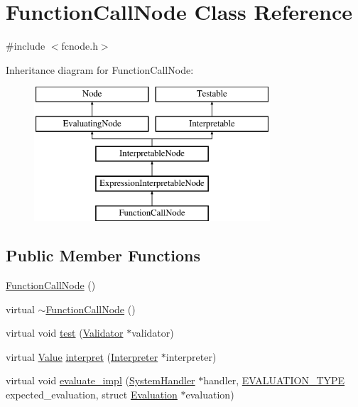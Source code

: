\hypertarget{classFunctionCallNode}{}\section{Function\+Call\+Node Class Reference}
\label{classFunctionCallNode}


{\ttfamily \#include $<$fcnode.\+h$>$}

Inheritance diagram for Function\+Call\+Node\+:\begin{figure}[H]
\begin{center}
\leavevmode
\includegraphics[height=5.000000cm]{classFunctionCallNode}
\end{center}
\end{figure}
\subsection*{Public Member Functions}
\begin{DoxyCompactItemize}
\item 
\hyperlink{classFunctionCallNode_af4c639d83ec4fc10ee4648277cedc134}{Function\+Call\+Node} ()
\item 
virtual \hyperlink{classFunctionCallNode_a781834ac40eada17d2f9dc53a8bd26e5}{$\sim$\+Function\+Call\+Node} ()
\item 
virtual void \hyperlink{classFunctionCallNode_a5a7f576984942e2e39057d716d8a5547}{test} (\hyperlink{classValidator}{Validator} $\ast$validator)
\item 
virtual \hyperlink{classValue}{Value} \hyperlink{classFunctionCallNode_a1d0d8806b7dd501ed43da58f77f7c49e}{interpret} (\hyperlink{classInterpreter}{Interpreter} $\ast$interpreter)
\item 
virtual void \hyperlink{classFunctionCallNode_a65f15b75804343caf5c4ce291460b1dc}{evaluate\+\_\+impl} (\hyperlink{classSystemHandler}{System\+Handler} $\ast$handler, \hyperlink{statics_8h_a6664c451ca7787483a7981cc1de68dbb}{E\+V\+A\+L\+U\+A\+T\+I\+O\+N\+\_\+\+T\+Y\+PE} expected\+\_\+evaluation, struct \hyperlink{structEvaluation}{Evaluation} $\ast$evaluation)
\end{DoxyCompactItemize}
